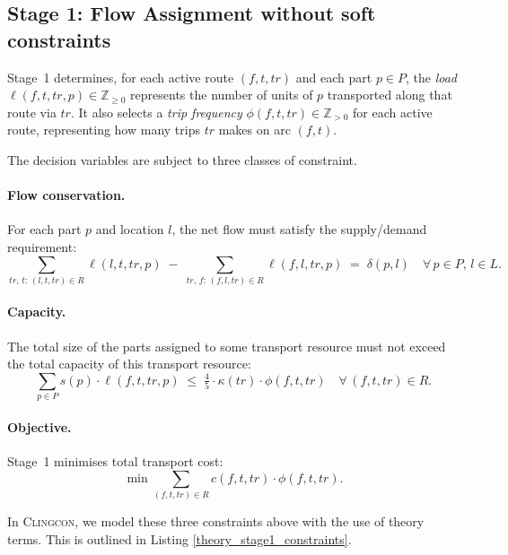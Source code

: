 \documentclass{article}
\begin{document}
\subsection{Stage 1: Flow Assignment without soft constraints}

Stage~1 determines, for each active route $(f, t, tr)$ and each part
$p \in P$, the \emph{load} $\ell(f, t, tr, p) \in \mathbb{Z}_{\geq 0}$ represents the number of units of $p$ transported along that route via $tr$.
It also selects a \emph{trip frequency} $\phi(f, t, tr) \in \mathbb{Z}_{>0}$
for each active route, representing how many trips $tr$ makes on arc
$(f, t)$.

The decision variables are subject to three classes of constraint.

\paragraph{Flow conservation.} For each part $p$ and location $l$, the
net flow must satisfy the supply/demand requirement:
\[
    \sum_{tr,\, t:\, (l,t,tr) \in R} \ell(l,t,tr,p)
    \;-\;
    \sum_{tr,\, f:\, (f,l,tr) \in R} \ell(f,l,tr,p)
    \;=\; \delta(p, l)
    \quad \forall\, p \in P,\, l \in L.
\]

\paragraph{Capacity.} The total size of the parts assigned to some transport resource must not exceed the total capacity of this transport resource:
\[
    \sum_{p \in P} s(p)\cdot \ell(f, t, tr, p)
    \;\leq\; \tfrac{4}{5}\cdot \kappa(tr) \cdot \phi(f, t, tr)
    \quad \forall\, (f, t, tr) \in R.
\]

\paragraph{Objective.} Stage~1 minimises total transport cost:
\[
    \min \sum_{(f,t,tr) \in R} c(f, t, tr) \cdot \phi(f, t, tr).
\]

In \textsc{Clingcon}, we model these three constraints above with the use of theory terms. This is outlined in Listing \ref{theory_stage1_constraints}.
\end{document}
